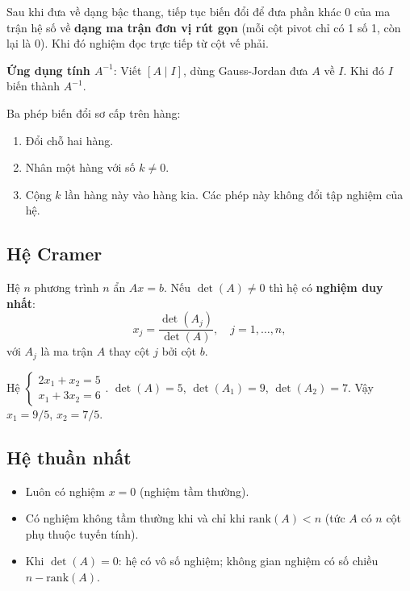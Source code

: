 \documentclass[12pt,a4paper]{article}
\begin{document}
\begin{phuongphap}[title={Phương pháp Gauss-Jordan}]
  Sau khi đưa về dạng bậc thang, tiếp tục biến đổi để đưa phần khác 0 của ma trận hệ số về \textbf{dạng ma trận đơn vị rút gọn} (mỗi cột pivot chỉ có 1 số 1, còn lại là 0). Khi đó nghiệm đọc trực tiếp từ cột vế phải.
  
  \textbf{Ứng dụng tính $A^{-1}$}: Viết $[A \mid I]$, dùng Gauss-Jordan đưa $A$ về $I$. Khi đó $I$ biến thành $A^{-1}$.
\end{phuongphap}

\begin{luuy}
  Ba phép biến đổi sơ cấp trên hàng: 
  \begin{enumerate}
      \item Đổi chỗ hai hàng.
      \item Nhân một hàng với số $k \ne 0$.
      \item Cộng $k$ lần hàng này vào hàng kia. Các phép này không đổi tập nghiệm của hệ.
  \end{enumerate}
\end{luuy}

\subsection{Hệ Cramer}

\begin{dinhly}[title={Công thức Cramer}]
  Hệ $n$ phương trình $n$ ẩn $Ax = b$. Nếu $\det(A) \ne 0$ thì hệ có \textbf{nghiệm duy nhất}:
  \[
    x_j = \frac{\det(A_j)}{\det(A)}, \quad j = 1, \ldots, n,
  \]
  với $A_j$ là ma trận $A$ thay cột $j$ bởi cột $b$.
\end{dinhly}

\begin{vidu}
  Hệ $\begin{cases} 2x_1 + x_2 = 5 \\ x_1 + 3x_2 = 6 \end{cases}$. $\det(A) = 5$, $\det(A_1) = 9$, $\det(A_2) = 7$. Vậy $x_1 = 9/5$, $x_2 = 7/5$.
\end{vidu}

\subsection{Hệ thuần nhất}

\begin{dinhly}[title={Hệ thuần nhất $Ax = 0$}]
  \begin{itemize}
    \item Luôn có nghiệm $x = 0$ (nghiệm tầm thường).
    \item Có nghiệm không tầm thường khi và chỉ khi $\mathrm{rank}(A) < n$ (tức $A$ có $n$ cột phụ thuộc tuyến tính).
    \item Khi $\det(A) = 0$: hệ có vô số nghiệm; không gian nghiệm có số chiều $n - \mathrm{rank}(A)$.
  \end{itemize}
\end{dinhly}
\end{document}
